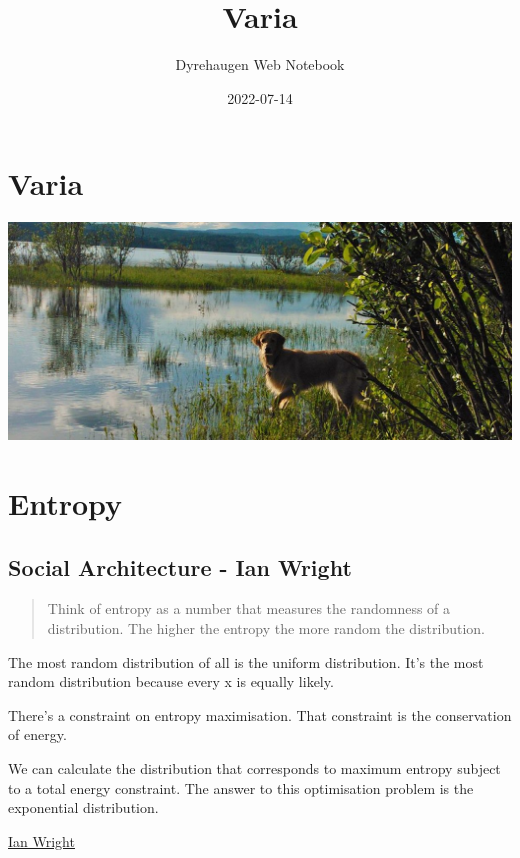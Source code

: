 \documentclass[
]{book}
\title{Varia}
\author{Dyrehaugen Web Notebook}
\date{2022-07-14}
\begin{document}
\maketitle

{
\setcounter{tocdepth}{1}
\tableofcontents
}
\hypertarget{varia}{%
\chapter{Varia}\label{varia}}

\includegraphics{fig/zelda.jpg}

\hypertarget{entropy}{%
\chapter{Entropy}\label{entropy}}

\hypertarget{social-architecture---ian-wright}{%
\section{Social Architecture - Ian Wright}\label{social-architecture---ian-wright}}

\begin{quote}
Think of entropy as a number that measures the randomness of a distribution.
The higher the entropy the more random the distribution.
\end{quote}

The most random distribution of all is the uniform distribution.
It's the most random distribution because every x is equally likely.

There's a constraint on entropy maximisation.
That constraint is the conservation of energy.

We can calculate the distribution that corresponds
to maximum entropy subject to a total energy constraint.
The answer to this optimisation problem is the exponential distribution.

\href{https://ianwrightsite.wordpress.com/2017/11/16/the-social-architecture-of-capitalism/}{Ian Wright}
\end{document}

